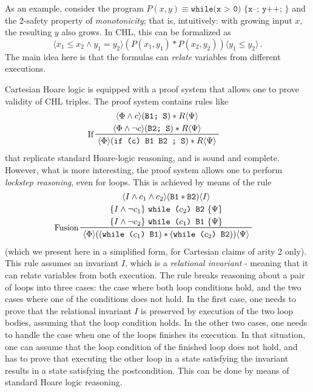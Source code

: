 As an example, consider the program $P(x,y) \equiv \texttt{while(x > 0) \{ x--; y++; \} }$ and the 2-safety property
of \emph{monotonicity}; that is, intuitively: with growing input $x$, the resulting $y$ also grows.
In CHL, this can be formalized as
\begin{equation*}
\langle x_1 \leq x_2 \land y_1 = y_2  \rangle (P(x_1, y_1) * P(x_2, y_2)) \langle y_1 \leq y_2 \rangle \, .
\end{equation*}
The main idea here is that the formulas can \emph{relate} variables from different executions.

Cartesian Hoare logic is equipped with a proof system that allows one to prove validity of CHL triples.
The proof system contains rules like
\begin{align*}
    & \prftree[l]{If}
      { \prfStackPremises
        { \langle \Phi \land c \rangle (\texttt{B1; S}) * R \langle \Psi \rangle }
        { \langle \Phi \land \neg c \rangle (\texttt{B2; S}) * R \langle \Psi \rangle }
      }
      { \langle \Phi \rangle (\texttt{if (c) {B1} {B2} ; S}) * R \langle \Psi \rangle }
\end{align*}
that replicate standard Hoare-logic reasoning, and is sound and complete.
However, what is more interesting, the proof system allows one to perform \emph{lockstep reasoning},
even for loops. This is achieved by means of the rule
\begin{align*}
  & \prftree[l]{Fusion}
    { \prfStackPremises
    { \langle I \land c_1 \land c_2 \rangle (\texttt{B1} * \texttt{B2}) \langle I \rangle }
    { \{ I \land \neg c_1 \}\ \texttt{while (}c_2\texttt{) {B2}}\ \{ \Psi \} }
    { \{ I \land \neg c_2 \}\ \texttt{while (}c_1\texttt{) {B1}}\ \{ \Psi \} }
  }
  { \langle \Phi \rangle ((\texttt{while (}c_1\texttt{) {B1}}) * (\texttt{while (}c_2\texttt{) {B2}}))  \langle \Psi \rangle }
\end{align*}
(which we present here in a simplified form, for Cartesian claims of arity 2 only).
This rule assumes an invariant $I$, which is a \emph{relational invariant} - meaning that it can relate variables
from both execution.
The rule breaks reasoning about a pair of loops into three cases: the case where both loop conditions hold,
and the two cases where one of the conditions does not hold.
In the first case, one needs to prove that the relational invariant $I$ is preserved by execution of the two loop bodies,
assuming that the loop condition holds.
In the other two cases, one needs to handle the case when one of the loops finishes its execution.
In that situation, one can assume that the loop condition of the finished loop does not hold,
and has to prove that executing the other loop in a state satisfying the invariant results in a state
satisfying the postcondition. This can be done by means of standard Hoare logic reasoning.

